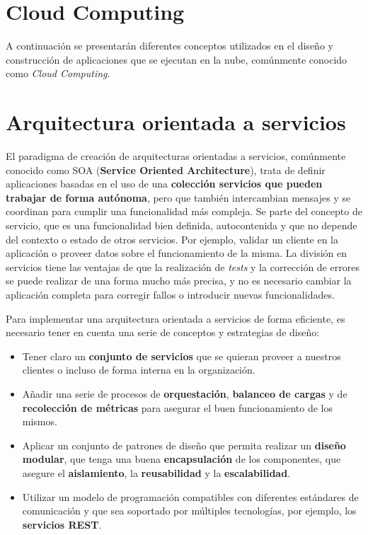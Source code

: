 \section{Cloud Computing}\label{sec:soa}
A continuación se presentarán diferentes conceptos utilizados en el diseño y construcción de aplicaciones que se ejecutan en la nube, comúnmente conocido como \emph{Cloud Computing}.

\section{Arquitectura orientada a servicios}\label{sec:soa}
El paradigma de creación de arquitecturas orientadas a servicios, comúnmente conocido como SOA (\textbf{Service Oriented Architecture}), trata de definir aplicaciones basadas en el uso de una \textbf{colección servicios que pueden trabajar de forma autónoma}, pero que también intercambian mensajes y se coordinan para cumplir una funcionalidad más compleja. Se parte del concepto de servicio, que es una funcionalidad bien definida, autocontenida y que no depende del contexto o estado de otros servicios. Por ejemplo, validar un cliente en la aplicación o proveer datos sobre el funcionamiento de la misma. La división en servicios tiene las ventajas de que la realización de \textit{tests} y la corrección de errores se puede realizar de una forma mucho más precisa, y no es necesario cambiar la aplicación completa para corregir fallos o introducir nuevas funcionalidades.

Para implementar una arquitectura orientada a servicios de forma eficiente, es necesario tener en cuenta una serie de conceptos y estrategias de diseño:
\begin{itemize}
\item Tener claro un \textbf{conjunto de servicios} que se quieran proveer a nuestros clientes o incluso de forma interna en la organización.
\item Añadir una serie de procesos de \textbf{orquestación}, \textbf{balanceo de cargas} y de \textbf{recolección de métricas} para asegurar el buen funcionamiento de los mismos.
\item Aplicar un conjunto de patrones de diseño que permita realizar un \textbf{diseño modular}, que tenga una buena \textbf{encapsulación} de los componentes, que asegure el \textbf{aislamiento}, la \textbf{reusabilidad} y la \textbf{escalabilidad}.
\item Utilizar un modelo de programación compatibles con diferentes estándares de comunicación y que sea soportado por múltiples tecnologías, por ejemplo, los \textbf{servicios REST}.
\end{itemize}

